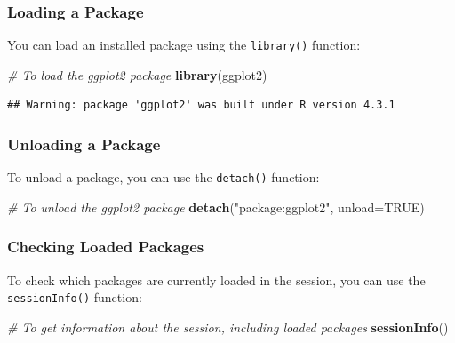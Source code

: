 \documentclass[
  b5paper]{book}
\newenvironment{Shaded}{\begin{snugshade}}{\end{snugshade}}
\newcommand{\AttributeTok}[1]{\textcolor[rgb]{0.13,0.29,0.53}{#1}}
\newcommand{\CommentTok}[1]{\textcolor[rgb]{0.56,0.35,0.01}{\textit{#1}}}
\newcommand{\ConstantTok}[1]{\textcolor[rgb]{0.56,0.35,0.01}{#1}}
\newcommand{\FunctionTok}[1]{\textcolor[rgb]{0.13,0.29,0.53}{\textbf{#1}}}
\newcommand{\NormalTok}[1]{#1}
\newcommand{\StringTok}[1]{\textcolor[rgb]{0.31,0.60,0.02}{#1}}
\begin{document}
\hypertarget{loading-a-package}{%
\subsubsection*{Loading a Package}\label{loading-a-package}}

You can load an installed package using the \texttt{library()} function:

\begin{Shaded}
\begin{Highlighting}[]
\CommentTok{\# To load the ggplot2 package}
\FunctionTok{library}\NormalTok{(ggplot2)}
\end{Highlighting}
\end{Shaded}

\begin{verbatim}
## Warning: package 'ggplot2' was built under R version 4.3.1
\end{verbatim}

\hypertarget{unloading-a-package}{%
\subsubsection*{Unloading a Package}\label{unloading-a-package}}

To unload a package, you can use the \texttt{detach()} function:

\begin{Shaded}
\begin{Highlighting}[]
\CommentTok{\# To unload the ggplot2 package}
\FunctionTok{detach}\NormalTok{(}\StringTok{"package:ggplot2"}\NormalTok{, }\AttributeTok{unload=}\ConstantTok{TRUE}\NormalTok{)}
\end{Highlighting}
\end{Shaded}

\hypertarget{checking-loaded-packages}{%
\subsubsection*{Checking Loaded Packages}\label{checking-loaded-packages}}

To check which packages are currently loaded in the session, you can use the \texttt{sessionInfo()} function:

\begin{Shaded}
\begin{Highlighting}[]
\CommentTok{\# To get information about the session, including loaded packages}
\FunctionTok{sessionInfo}\NormalTok{()}
\end{Highlighting}
\end{Shaded}
\end{document}
